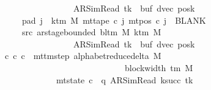 \begin{isabellebody}
\ \ \ \ \ \ \ \ \ \ \ \ \ \ \ \ \ \ \ {\isacharparenleft}{\kern0pt}AR{\isacharunderscore}{\kern0pt}SimRead{\isacharcomma}{\kern0pt}\ tk{\isacharcomma}{\kern0pt}\ {}{\isacharcomma}{\kern0pt}\ buf{\isacharcomma}{\kern0pt}\ dvec{\isacharcomma}{\kern0pt}\ posk{\isacharparenright}{\kern0pt}{\isachardoublequoteclose}\isanewline
\ \ \ \ \ \ \ pad{}{\isacharcolon}{\kern0pt}\ {\isachardoublequoteopen}{\isasymforall}j\ {\isasymge}\ k{\isacharunderscore}{\kern0pt}tm\ M{\isachardot}{\kern0pt}\ mt{\isacharunderscore}{\kern0pt}tape\ c{\isacharprime}{\kern0pt}\ j\ {\isacharparenleft}{\kern0pt}mt{\isacharunderscore}{\kern0pt}pos\ c{\isacharprime}{\kern0pt}\ j{\isacharparenright}{\kern0pt}\ {\isacharequal}{\kern0pt}\ BLANK{}{\isachardoublequoteclose}\isanewline
\ \ \ \ \ \ \ src{}{\isacharcolon}{\kern0pt}\ {\isachardoublequoteopen}ar{\isacharunderscore}{\kern0pt}stage{\isacharunderscore}{\kern0pt}bounded\ {\isacharparenleft}{\kern0pt}bl{\isacharunderscore}{\kern0pt}tm\ M{\isacharparenright}{\kern0pt}\ {\isacharparenleft}{\kern0pt}k{\isacharunderscore}{\kern0pt}tm\ M{\isacharparenright}{\kern0pt}\isanewline
\ \ \ \ \ \ \ \ \ \ \ \ \ \ \ \ \ \ \ {\isacharparenleft}{\kern0pt}AR{\isacharunderscore}{\kern0pt}SimRead{\isacharcomma}{\kern0pt}\ tk{\isacharcomma}{\kern0pt}\ {}{\isacharcomma}{\kern0pt}\ buf{\isacharcomma}{\kern0pt}\ dvec{\isacharcomma}{\kern0pt}\ posk{\isacharparenright}{\kern0pt}{\isachardoublequoteclose}\isanewline
\ \ \ {\isachardoublequoteopen}{\isasymexists}c{\isacharprime}{\kern0pt}{\isacharprime}{\kern0pt}{\isachardot}{\kern0pt}\ {\isacharparenleft}{\kern0pt}c{\isacharprime}{\kern0pt}{\isacharcomma}{\kern0pt}\ c{\isacharprime}{\kern0pt}{\isacharprime}{\kern0pt}{\isacharparenright}{\kern0pt}\ {\isasymin}\ {\isacharparenleft}{\kern0pt}mttm{\isacharunderscore}{\kern0pt}step\ {\isacharparenleft}{\kern0pt}alphabet{\isacharunderscore}{\kern0pt}reduce{\isacharunderscore}{\kern0pt}delta\ M{\isacharparenright}{\kern0pt}{\isacharparenright}{\kern0pt}\isanewline
\ \ \ \ \ \ \ \ \ \ \ \ \ \ \ \ \ \ \ \ \ \ \ \ \ \ \ \ \ \ {\isacharcircum}{\kern0pt}{\isacharcircum}{\kern0pt}\ {\isacharparenleft}{\kern0pt}block{\isacharunderscore}{\kern0pt}width\ {\isacharparenleft}{\kern0pt}{\isasymGamma}{\isacharunderscore}{\kern0pt}tm\ M{\isacharparenright}{\kern0pt}\ {\isacharplus}{\kern0pt}\ {}{\isacharparenright}{\kern0pt}\isanewline
\ \ \ \ \ \ \ \ \ \ \ \ \ \ {\isasymand}\ mt{\isacharunderscore}{\kern0pt}state\ c{\isacharprime}{\kern0pt}{\isacharprime}{\kern0pt}\ {\isacharequal}{\kern0pt}\ {\isacharparenleft}{\kern0pt}q{\isacharcomma}{\kern0pt}\ AR{\isacharunderscore}{\kern0pt}SimRead{\isacharcomma}{\kern0pt}\ k{\isacharunderscore}{\kern0pt}succ\ tk{\isacharcomma}{\kern0pt}\ {}{\isacharcomma}{\kern0pt}\isanewline

\end{isabellebody}

